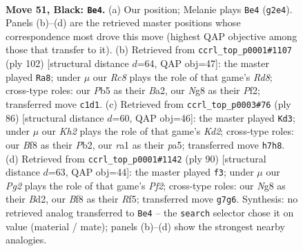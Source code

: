 \documentclass[11pt]{article}
\begin{document}
\clearpage

\begin{figure}[p]\centering
\begin{subfigure}{0.46\textwidth}\centering
\resizebox{\linewidth}{!}{%
\newchessgame
\chessboard[
  setfen={5bn1/p5pk/P7/1p3p1P/1P3P1K/1R2P3/6b1/RNr5 b - - 0 51},
  showmover=false,
  pgfstyle=straightmove, color=movearrow, markmove={g2-e4}
]}
\caption{}
\end{subfigure}\hfill
\begin{subfigure}{0.46\textwidth}\centering
\resizebox{\linewidth}{!}{%
\newchessgame
\chessboard[
  setfen={3R4/3n1k1p/3r1p2/p2p2pP/1b1p2P1/3P4/B1P2P1N/6K1 w - - 17 52},
  showmover=false,
  pgfstyle=straightmove, color=movearrow, markmove={d8-a8}
]}
\caption{}
\end{subfigure}
\\[4pt]
\begin{subfigure}{0.46\textwidth}\centering
\resizebox{\linewidth}{!}{%
\newchessgame
\chessboard[
  setfen={8/1Rn1k1p1/4p2p/p1r4P/Pp6/5BP1/1P1K1P2/8 w - - 15 44},
  showmover=false,
  pgfstyle=straightmove, color=movearrow, markmove={d2-d3}
]}
\caption{}
\end{subfigure}\hfill
\begin{subfigure}{0.46\textwidth}\centering
\resizebox{\linewidth}{!}{%
\newchessgame
\chessboard[
  setfen={6k1/1p2r3/p2r2nR/4pR2/PP1p2P1/3K4/3B1P2/8 w - - 4 46},
  showmover=false,
  pgfstyle=straightmove, color=movearrow, markmove={f2-f3}
]}
\caption{}
\end{subfigure}
\caption{\textbf{Move 51, Black: \texttt{Be4}.} (a) Our position; Melanie plays \texttt{Be4} (\texttt{g2e4}). Panels (b)--(d) are the retrieved master positions whose correspondence most drove this move (highest QAP objective among those that transfer to it). (b) Retrieved from \texttt{ccrl\_top\_p0001\#1107} (ply 102) [structural distance $d$=64, QAP obj=47]: the master played \texttt{Ra8}; under $\mu$ our \emph{Rc8} plays the role of that game's \emph{Rd8}; cross-type roles: our \emph{P}b5 as their \emph{B}a2, our \emph{N}g8 as their \emph{P}f2; transferred move \texttt{c1d1}. (c) Retrieved from \texttt{ccrl\_top\_p0003\#76} (ply 86) [structural distance $d$=60, QAP obj=46]: the master played \texttt{Kd3}; under $\mu$ our \emph{Kh2} plays the role of that game's \emph{Kd2}; cross-type roles: our \emph{B}f8 as their \emph{P}b2, our \emph{r}a1 as their \emph{p}a5; transferred move \texttt{h7h8}. (d) Retrieved from \texttt{ccrl\_top\_p0001\#1142} (ply 90) [structural distance $d$=63, QAP obj=44]: the master played \texttt{f3}; under $\mu$ our \emph{Pg2} plays the role of that game's \emph{Pf2}; cross-type roles: our \emph{N}g8 as their \emph{B}d2, our \emph{B}f8 as their \emph{R}f5; transferred move \texttt{g7g6}. Synthesis: no retrieved analog transferred to \texttt{Be4} -- the \texttt{search} selector chose it on value (material / mate); panels (b)--(d) show the strongest nearby analogies.}
\label{fig:thought-m101}
\end{figure}
\end{document}
